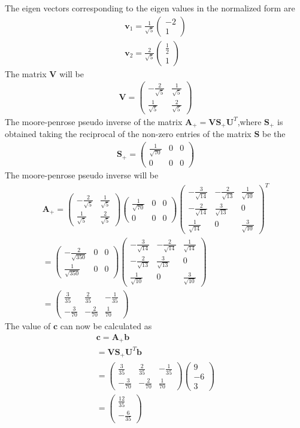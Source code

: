 \documentclass[journal,12pt,twocolumn]{IEEEtran}
\newcommand{\myvec}[1]{\ensuremath{\begin{pmatrix}#1\end{pmatrix}}}
\numberwithin{equation}{subsection}
\let\vec\mathbf
\begin{document}
The eigen vectors corresponding to the eigen values in the normalized form are
\begin{align}
    \vec{v}_1=\frac{1}{\sqrt{5}}\myvec{-2\\1}\\
    \vec{v}_2=\frac{2}{\sqrt{5}}\myvec{\frac{1}{2}\\1}
\end{align}
The matrix $\vec{V}$ will be
\begin{align}
    \vec{V}=\myvec{-\frac{2}{\sqrt{5}}&\frac{1}{\sqrt{5}}\\\frac{1}{\sqrt{5}}&\frac{2}{\sqrt{5}}}
\end{align}
The moore-penrose pseudo inverse of the matrix $\vec{A}_+=\vec{V}\vec{S}_+\vec{U}^T$,where $\vec{S}_+$ is obtained taking the reciprocal of the non-zero entries of the matrix $\vec{S}$ be the 
\begin{align}
    \vec{S}_+=\myvec{\frac{1}{\sqrt{70}}&0&0\\0&0&0}
\end{align}
The moore-penrose pseudo inverse will be
\begin{align}
    \vec{A}_+=\myvec{-\frac{2}{\sqrt{5}}&\frac{1}{\sqrt{5}}\\\frac{1}{\sqrt{5}}&\frac{2}{\sqrt{5}}}\myvec{\frac{1}{\sqrt{70}}&0&0\\0&0&0}\myvec{-\frac{3}{\sqrt{14}}&-\frac{2}{\sqrt{13}}&\frac{1}{\sqrt{10}}\\-\frac{2}{\sqrt{14}}&\frac{3}{\sqrt{13}}&0\\\frac{1}{\sqrt{14}}&0&\frac{3}{\sqrt{10}}}^T\\
    =\myvec{-\frac{2}{\sqrt{350}}&0&0\\\frac{1}{\sqrt{350}}&0&0}\myvec{-\frac{3}{\sqrt{14}}&-\frac{2}{\sqrt{14}}&\frac{1}{\sqrt{14}}\\-\frac{2}{\sqrt{13}}&\frac{3}{\sqrt{13}}&0\\\frac{1}{\sqrt{10}}&0&\frac{3}{\sqrt{10}}}\\
    =\myvec{\frac{3}{35}&\frac{2}{35}&-\frac{1}{35}\\-\frac{3}{70}&-\frac{2}{70}&\frac{1}{70}}
\end{align}
The value of $\vec{c}$ can now be calculated as
\begin{align}
    \vec{c}=\vec{A}_+\vec{b}\\
    =\vec{V}\vec{S}_+\vec{U}^T\vec{b}\\
    =\myvec{\frac{3}{35}&\frac{2}{35}&-\frac{1}{35}\\-\frac{3}{70}&-\frac{2}{70}&\frac{1}{70}}\myvec{9\\-6\\3}\\
    =\myvec{\frac{12}{35}\\-\frac{6}{35}}
\end{align}
\end{document}
